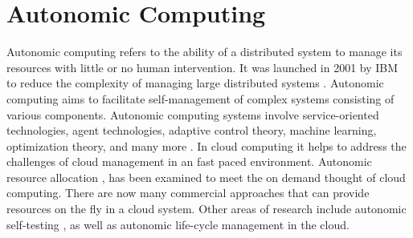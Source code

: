 \section{Autonomic Computing}
Autonomic computing refers to the ability of a distributed system to manage its resources with little or no human intervention. It was launched in 2001 by IBM to reduce the complexity of managing large distributed systems \cite{horn2001autonomic}. Autonomic computing aims to facilitate self-management of complex systems consisting of various components. Autonomic computing systems involve service-oriented technologies, agent technologies, adaptive control theory, machine learning, optimization theory, and many more \citep{fei2005design} \citep{zhao2009survey}. In cloud computing it helps to address the challenges of cloud management in an fast paced environment. Autonomic resource allocation \cite{inproceedingshu2009}, \cite{Casalicchio:2013:ARP:2494621.2494623} has been examined to meet the on demand thought of cloud computing. There are now many commercial approaches that can provide resources on the fly in a cloud system.
Other areas of research include autonomic self-testing \cite{5463688}, as well as autonomic life-cycle management \cite{brandic2009towards} in the cloud.

